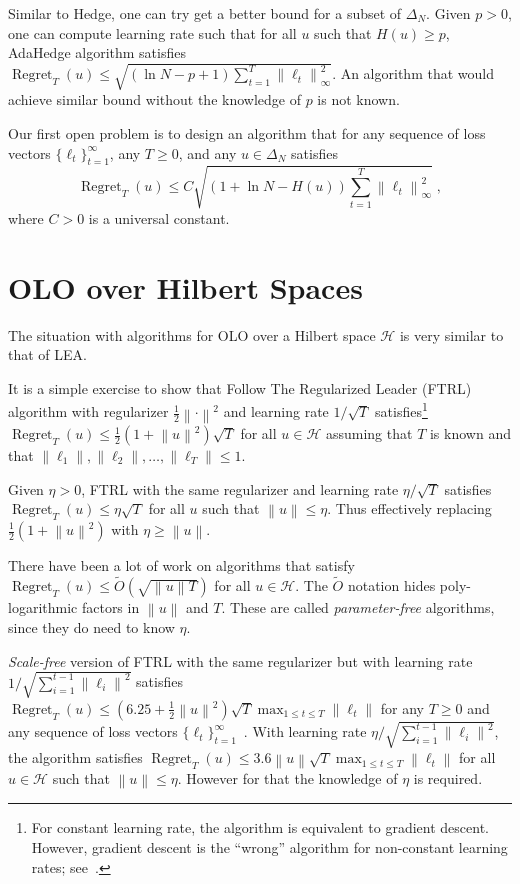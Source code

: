 \documentclass{colt2016} %
\DeclareMathOperator{\Regret}{Regret}
\renewcommand{\H}{\mathcal{H}}  %
\newcommand{\norm}[1]{\left\|{#1}\right\|}
\begin{document}
Similar to Hedge, one can try get a better bound for a subset of $\Delta_N$.
Given $p > 0$, one can compute learning rate such that for all $u$ such that
$H(u) \ge p$, AdaHedge algorithm satisfies $\Regret_T(u) \le \sqrt{(\ln N - p +
1) \sum_{t=1}^T \norm{\ell_t}_\infty^2}$. An algorithm that would achieve
similar bound without the knowledge of $p$ is not known.

Our first open problem is to design an algorithm that for any
sequence of loss vectors $\{\ell_t\}_{t=1}^\infty$, any $T \ge 0$,
and any $u \in \Delta_N$ satisfies
$$
\Regret_T(u) \le C \sqrt{(1 + \ln N - H(u)) \sum_{t=1}^T \norm{\ell_t}_\infty^2} \; ,
$$
where $C > 0$ is a universal constant.

\section{OLO over Hilbert Spaces}

The situation with algorithms for OLO over a Hilbert space $\H$ is very similar
to that of LEA.

It is a simple exercise to show that Follow The Regularized Leader (FTRL)
algorithm with regularizer $\frac{1}{2}\norm{\cdot}^2$ and learning rate
$1/\sqrt{T}$ satisfies\footnote{For constant learning rate, the algorithm is
equivalent to gradient descent. However, gradient descent is the ``wrong'' algorithm
for non-constant learning rates; see~\cite{Orabona-Pal-2016-scale-free}.}
$\Regret_T(u) \le \frac{1}{2}(1 + \norm{u}^2) \sqrt{T}$ for all $u \in \H$
assuming that $T$ is known and that $\norm{\ell_1}, \norm{\ell_2}, \dots,
\norm{\ell_T} \le 1$.

Given $\eta > 0$, FTRL with the same regularizer and
learning rate $\eta/\sqrt{T}$ satisfies $\Regret_T(u) \le \eta \sqrt{T}$
for all $u$ such that $\norm{u} \le \eta$. Thus effectively replacing
$\frac{1}{2}(1 + \norm{u}^2)$ with $\eta \ge \norm{u}$.

There have been a lot of work \citep{Streeter-McMahan-2012, Orabona-2013,
McMahan-Abernethy-2013, McMahan-Orabona-2014} on algorithms that satisfy
$\Regret_T(u) \le \widetilde O(\sqrt{\norm{u} T})$ for all $u \in \H$.
The $\widetilde O$ notation hides poly-logarithmic factors in $\norm{u}$ and
$T$. These are called \emph{parameter-free} algorithms, since they do need to
know $\eta$.

\emph{Scale-free} version of FTRL with the same regularizer but with learning
rate $1/\sqrt{\sum_{i=1}^{t-1} \norm{\ell_i}^2}$ satisfies $\Regret_T(u) \le
(6.25 + \frac{1}{2}\norm{u}^2) \sqrt{T} \max_{1 \le t \le T} \norm{\ell_t}$ for
any $T \ge 0$ and any sequence of loss vectors $\{\ell_t\}_{t=1}^\infty$~\citep{Orabona-Pal-2015}. With learning
rate $\eta/\sqrt{\sum_{i=1}^{t-1} \norm{\ell_i}^2}$, the algorithm satisfies
$\Regret_T(u) \le 3.6 \norm{u} \sqrt{T} \max_{1 \le t \le T} \norm{\ell_t}$ for
all $u \in \H$ such that $\norm{u} \le \eta$. However for that the knowledge
of $\eta$ is required.
\end{document}
